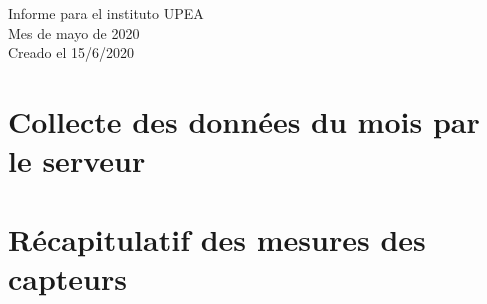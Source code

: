 \documentclass[12pt,a4paper]{article}
\begin{document}
	\begin{center}
		\huge Informe para el instituto UPEA \\
		\vspace*{5pt}
		\LARGE Mes de mayo de 2020 \\
		\vspace*{0pt}
		\Large Creado el 15/6/2020
	\end{center}

	\vspace*{20pt}

	{
		\begin{spacing}{0.5}
		\tableofcontents
		\end{spacing}
	}
	\pagebreak

	\section{Collecte des données du mois par le serveur}


\pagebreak

\section{Récapitulatif des mesures des capteurs}


\pagebreak
\end{document}
